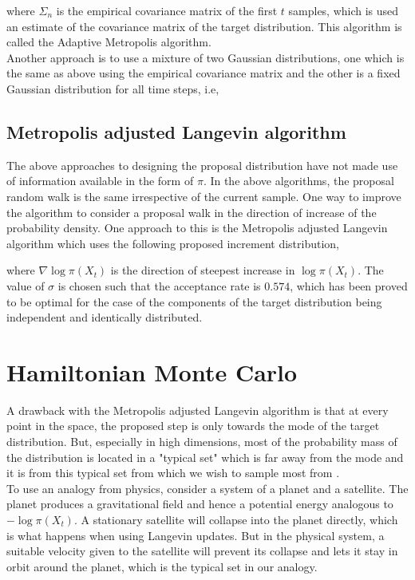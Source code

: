 \documentclass[letterpaper,english,10pt]{article}
\begin{document}
where $\Sigma_n$ is the empirical covariance matrix of the first $t$ samples, which is used an estimate of the covariance matrix of the target distribution. This algorithm is called the Adaptive Metropolis algorithm.\\

Another approach is to use a mixture of two Gaussian distributions, one which is the same as above using the empirical covariance matrix and the other is a fixed Gaussian distribution for all time steps, i.e,


\subsection{Metropolis adjusted Langevin algorithm}
The above approaches to designing the proposal distribution have not made use of information available in the form of $\pi$. In the above algorithms, the proposal random walk is the same irrespective of the current sample. One way to improve the algorithm to consider a proposal walk in the direction of increase of the probability density. One approach to this is the Metropolis adjusted Langevin algorithm which uses the following proposed increment distribution,

where $\nabla \log \pi(X_t)$ is the direction of steepest increase in $\log \pi(X_t)$. The value of $\sigma$ is chosen such that the acceptance rate is $0.574$, which has been proved to be optimal for the case of the components of the target distribution being independent and identically distributed.

\section{Hamiltonian Monte Carlo}
A drawback with the Metropolis adjusted Langevin algorithm is that at every point in the space, the proposed step is only towards the mode of the target distribution. But, especially in high dimensions, most of the probability mass of the distribution is located in a "typical set" which is far away from the mode and it is from this typical set from which we wish to sample most from \cite{2017arXiv170102434B}. \\

To use an analogy from physics, consider a system of a planet and a satellite. The planet produces a gravitational field and hence a potential energy analogous to $- \log \pi(X_t)$. A stationary satellite will collapse into the planet directly, which is what happens when using Langevin updates. But in the physical system, a suitable velocity given to the satellite will prevent its collapse and lets it stay in orbit around the planet, which is the typical set in our analogy. \\
\end{document}
